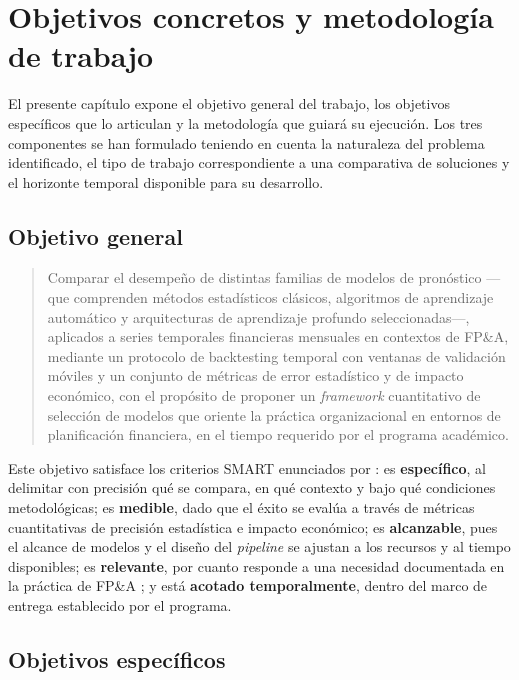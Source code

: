 \chapter{Objetivos concretos y metodología de trabajo}
\label{cap:objetivos}

El presente capítulo expone el objetivo general del trabajo, los objetivos específicos que lo articulan y la metodología que guiará su ejecución. Los tres componentes se han formulado teniendo en cuenta la naturaleza del problema identificado, el tipo de trabajo correspondiente a una comparativa de soluciones y el horizonte temporal disponible para su desarrollo.

\section{Objetivo general}
\label{sec:objetivo_general}

\begin{quote}
Comparar el desempeño de distintas familias de modelos de pronóstico ---que comprenden métodos estadísticos clásicos, algoritmos de aprendizaje automático y arquitecturas de aprendizaje profundo seleccionadas---, aplicados a series temporales financieras mensuales en contextos de FP\&A, mediante un protocolo de backtesting temporal con ventanas de validación móviles y un conjunto de métricas de error estadístico y de impacto económico, con el propósito de proponer un \textit{framework} cuantitativo de selección de modelos que oriente la práctica organizacional en entornos de planificación financiera, en el tiempo requerido por el programa académico.
\end{quote}

Este objetivo satisface los criterios SMART enunciados por \textcite{Armstrong2001}: es \textbf{específico}, al delimitar con precisión qué se compara, en qué contexto y bajo qué condiciones metodológicas; es \textbf{medible}, dado que el éxito se evalúa a través de métricas cuantitativas de precisión estadística e impacto económico; es \textbf{alcanzable}, pues el alcance de modelos y el diseño del \textit{pipeline} se ajustan a los recursos y al tiempo disponibles; es \textbf{relevante}, por cuanto responde a una necesidad documentada en la práctica de FP\&A \parencite{Armstrong2001, Hyndman2021}; y está \textbf{acotado temporalmente}, dentro del marco de entrega establecido por el programa.

\section{Objetivos específicos}
\label{sec:objetivos_especificos}

